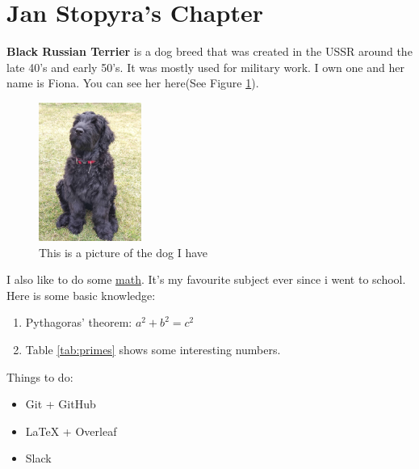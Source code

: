 \section{Jan Stopyra's Chapter}

    \textbf{Black Russian Terrier} is a dog breed that was created in the USSR around the late 40's and early 50's. It was mostly used for military work. I own one and her name is Fiona. You can see her here(See Figure \ref{fig:dog}).
\begin{figure}[h]
    \centering
    \label{fig:dog}
    \includegraphics[width=0.3\textwidth]{Pictures/dog.jpg}
    \caption{This is a picture of the dog I have}
\end{figure}

I also like to do some \underline{math}. It's my favourite subject ever since i went to school. Here is some basic knowledge:

\begin{enumerate}

    \item Pythagoras' theorem:
        \begin{math}a^2+b^2=c^2\end{math}
    

    \item Table \ref{tab:primes} shows some interesting numbers.
    
\end{enumerate}

Things to do:  
\begin{itemize}
    \item Git + GitHub
    \item LaTeX + Overleaf 
    \item Slack
\end{itemize}

